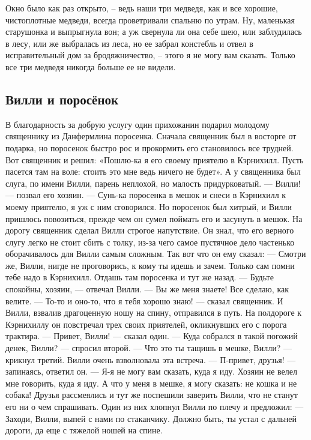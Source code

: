 Окно было как раз открыто, – ведь наши три медведя, как и все хорошие, чистоплотные медведи, всегда проветривали спальню по утрам. Ну, маленькая старушонка и выпрыгнула вон; а уж свернула ли она себе шею, или заблудилась в лесу, или же выбралась из леса, но ее забрал констебль и отвел в исправительный дом за бродяжничество, – этого я не могу вам сказать. Только все три медведя никогда больше ее не видели.

\newpage

\subsection*{Вилли и поросёнок}

В благодарность за добрую услугу один прихожанин подарил молодому священнику из Данфермлина поросенка.
Сначала священник был в восторге от подарка, но поросенок быстро рос и прокормить его становилось все трудней. Вот священник и решил: «Пошлю-ка я его своему приятелю в Кэрнихилл. Пусть пасется там на воле: стоить это мне ведь ничего не будет».
А у священника был слуга, по имени Вилли, парень неплохой, но малость придурковатый.
— Вилли! — позвал его хозяин. — Сунь-ка поросенка в мешок и снеси в Кэрнихилл к моему приятелю, я уж с ним сговорился.
Но поросенок был хитрый, и Вилли пришлось повозиться, прежде чем он сумел поймать его и засунуть в мешок.
На дорогу священник сделал Вилли строгое напутствие. Он знал, что его верного слугу легко не стоит сбить с толку, из-за чего самое пустячное дело частенько оборачивалось для Вилли самым сложным. Так вот что он ему сказал:
— Смотри же, Вилли, нигде не проговорись, к кому ты идешь и зачем. Только сам помни тебе надо в Кэрнихилл. Отдашь там поросенка и тут же назад.
— Будьте спокойны, хозяин, — отвечал Вилли. — Вы же меня знаете! Все сделаю, как велите.
— То-то и оно-то, что я тебя хорошо знаю! — сказал священник.
И Вилли, взвалив драгоценную ношу на спину, отправился в путь. На полдороге к Кэрнихиллу он повстречал трех своих приятелей, окликнувших его с порога трактира.
— Привет, Вилли! — сказал один.
— Куда собрался в такой погожий денек, Вилли? — спросил второй.
— Что это ты тащишь в мешке, Вилли? — крикнул третий.
Вилли очень взволновала эта встреча.
— П-привет, друзья! — запинаясь, ответил он. — Я-я не могу вам сказать, куда я иду. Хозяин не велел мне говорить, куда я иду. А что у меня в мешке, я могу сказать: не кошка и не собака!
Друзья рассмеялись и тут же поспешили заверить Вилли, что не станут его ни о чем спрашивать. Один из них хлопнул Вилли по плечу и предложил:
— Заходи, Вилли, выпей с нами по стаканчику. Должно быть, ты устал с дальней дороги, да еще с тяжелой ношей на спине.
